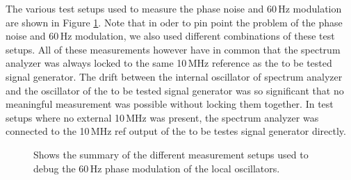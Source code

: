 \documentclass[12pt]{article}
\begin{document}
 
The various test setups used to measure the phase noise and 60\,Hz modulation are shown in Figure \ref{fig:measurement_setup_overview}. Note that in oder to pin point the problem of the phase noise and 60\,Hz modulation, we also used different combinations of these test setups. All of these measurements however have in common that the spectrum analyzer was always locked to the same 10\,MHz reference as the to be tested signal generator. The drift between the internal oscillator of spectrum analyzer and the oscillator of the to be tested signal generator was so significant that no meaningful measurement was possible without locking them together. In test setups where no external 10\,MHz was present, the spectrum analyzer was connected to the 10\,MHz ref output of the to be testes signal generator directly. 




%
\begin{figure}[H]
\caption{Shows the summary of the different measurement setups used to debug the 60\,Hz phase modulation of the local oscillators.}
\label{fig:measurement_setup_overview}
\end{figure}
%
\end{document}
